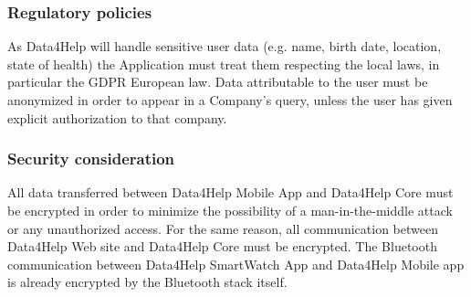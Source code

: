\subsubsection{Regulatory policies}
As Data4Help will handle sensitive user data (e.g. name, birth date, location, state of health) the Application must treat them respecting the local laws, in particular the GDPR European law. Data attributable to the user must be anonymized in order to appear in a Company's query, unless the user has given explicit authorization to that company.

\subsubsection{Security consideration}
All data transferred between Data4Help Mobile App and Data4Help Core must be encrypted in order to minimize the possibility of a man-in-the-middle attack or any unauthorized access.
For the same reason, all communication between Data4Help Web site and Data4Help Core must be encrypted.
The Bluetooth communication between Data4Help SmartWatch App and Data4Help Mobile app is already encrypted by the Bluetooth stack itself.

